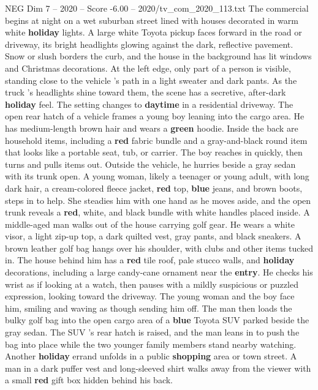 \begin{textsample}{NEG Dim 7 – 2020 – Score -6.00 – 2020/tv\_com\_2020\_113.txt}  \label{ex:f7_neg_003}
The commercial begins at night on a wet suburban street lined with houses decorated in warm white \textbf{holiday} lights.
A large white Toyota pickup faces forward in the road or driveway, its bright headlights glowing against the dark, reflective pavement.
Snow or slush borders the curb, and the house in the background has lit windows and Christmas decorations.
At the left edge, only part of a person is visible, standing close to the vehicle ’s path in a light sweater and dark pants.
As the truck ’s headlights shine toward them, the scene has a secretive, after-dark \textbf{holiday} feel.
The setting changes to \textbf{daytime} in a residential driveway.
The open rear hatch of a vehicle frames a young boy leaning into the cargo area.
He has medium-length brown hair and wears a \textbf{green} hoodie.
Inside the back are household items, including a \textbf{red} fabric bundle and a gray-and-black round item that looks like a portable seat, tub, or carrier.
The boy reaches in quickly, then turns and pulls items out.
Outside the vehicle, he hurries beside a gray sedan with its trunk open.
A young woman, likely a teenager or young adult, with long dark hair, a cream-colored fleece jacket, \textbf{red} top, \textbf{blue} jeans, and brown boots, steps in to help.
She steadies him with one hand as he moves aside, and the open trunk reveals a \textbf{red}, white, and black bundle with white handles placed inside.
A middle-aged man walks out of the house carrying golf gear.
He wears a white visor, a light zip-up top, a dark quilted vest, gray pants, and black sneakers.
A brown leather golf bag hangs over his shoulder, with clubs and other items tucked in.
The house behind him has a \textbf{red} tile roof, pale stucco walls, and \textbf{holiday} decorations, including a large candy-cane ornament near the \textbf{entry}.
He checks his wrist as if looking at a watch, then pauses with a mildly suspicious or puzzled expression, looking toward the driveway.
The young woman and the boy face him, smiling and waving as though sending him off.
The man then loads the bulky golf bag into the open cargo area of a \textbf{blue} Toyota SUV parked beside the gray sedan.
The SUV ’s rear hatch is raised, and the man leans in to push the bag into place while the two younger family members stand nearby watching.
Another \textbf{holiday} errand unfolds in a public \textbf{shopping} area or town street.
A man in a dark puffer vest and long-sleeved shirt walks away from the viewer with a small \textbf{red} gift box hidden behind his back.

\end{textsample}
